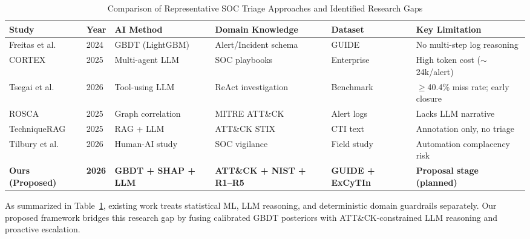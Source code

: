 \begin{table}[t]
\centering
\caption{Comparison of Representative SOC Triage Approaches and Identified Research Gaps}
\label{tab:related_work}
\begin{tabular}{@{}llllll@{}}
\toprule
\textbf{Study} & \textbf{Year} & \textbf{AI Method} & \textbf{Domain Knowledge} & \textbf{Dataset} & \textbf{Key Limitation} \\
\midrule
Freitas et al.~\cite{freitas2024} & 2024 & GBDT (LightGBM) & Alert/Incident schema & GUIDE & No multi-step log reasoning \\
CORTEX~\cite{wei2025} & 2025 & Multi-agent LLM & SOC playbooks & Enterprise & High token cost ($\sim$24k/alert) \\
Tsegai et al.~\cite{tsegai2026} & 2026 & Tool-using LLM & ReAct investigation & Benchmark & $\ge$40.4\% miss rate; early closure \\
ROSCA~\cite{garcia2025} & 2025 & Graph correlation & MITRE ATT\&CK & Alert logs & Lacks LLM narrative \\
TechniqueRAG~\cite{lekssays2025} & 2025 & RAG + LLM & ATT\&CK STIX & CTI text & Annotation only, no triage \\
Tilbury et al.~\cite{tilbury2026} & 2026 & Human-AI study & SOC vigilance & Field study & Automation complacency risk \\
\textbf{Ours (Proposed)} & \textbf{2026} & \textbf{GBDT + SHAP + LLM} & \textbf{ATT\&CK + NIST + R1--R5} & \textbf{GUIDE + ExCyTIn} & \textbf{Proposal stage (planned)} \\
\bottomrule
\end{tabular}
\end{table}

As summarized in Table~\ref{tab:related_work}, existing work treats statistical ML, LLM reasoning, and deterministic domain guardrails separately. Our proposed framework bridges this research gap by fusing calibrated GBDT posteriors with ATT\&CK-constrained LLM reasoning and proactive escalation.
